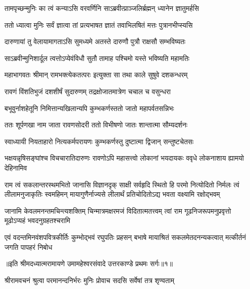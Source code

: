 \twolineshloka
{तामपृच्छन्मुनिः का त्वं कन्याऽसि वरवर्णिनि}
{साऽब्रवीत्प्राञ्जलिर्ब्रह्मन् ध्यानेन ज्ञातुमर्हसि} %

\twolineshloka
{ततो ध्यात्वा मुनिः सर्वं ज्ञात्वा तां प्रत्यभाषत}
{ज्ञातं तवाभिलषितं मत्तः पुत्रानभीप्स्यसि} %

\twolineshloka
{दारुणायां तु वेलायामागताऽसि सुमध्यमे}
{अतस्ते दारुणौ पुत्रौ राक्षसौ सम्भविष्यतः} %

\twolineshloka
{साऽब्रवीन्मुनिशार्दूल त्वत्तोऽप्येवंविधौ सुतौ}
{तामाह पश्चिमो यस्ते भविष्यति महामतिः} %

\twolineshloka
{महाभागवतः श्रीमान् रामभक्त्येकतत्परः}
{इत्युक्ता सा तथा काले सुषुवे दशकन्धरम्} %

\twolineshloka
{रावणं विंशतिभुजं दशशीर्षं सुदारुणम्}
{तद्रक्षोजातमात्रेण चचाल च वसुन्धरा} %

\twolineshloka
{बभूवुर्नाशहेतूनि निमित्तान्यखिलान्यपि}
{कुम्भकर्णस्ततो जातो महापर्वतसन्निभः} %

\twolineshloka
{ततः शूर्पणखा नाम जाता रावणसोदरी}
{ततो विभीषणो जातः शान्तात्मा सौम्यदर्शनः} %

\twolineshloka
{स्वाध्यायी नियताहारो नित्यकर्मपरायणः}
{कुम्भकर्णस्तु दुष्टात्मा द्विजान् सन्तुष्टचेतसः} %

\threelineshloka
{भक्षयन्नृषिसङ्घांश्च विचचारातिदारुणः}
{रावणोऽपि महासत्त्वो लोकानां भयदायकः}
{ववृधे लोकनाशाय ह्यामयो देहिनामिव} %

\fourlineindentedshloka
{राम त्वं सकलान्तरस्थमभितो जानासि विज्ञानदृक्}
{साक्षी सर्वहृदि स्थितो हि परमो नित्योदितो निर्मलः}
{त्वं लीलामनुजाकृतिः स्वमहिमन् मायागुणैर्नाज्यसे}
{लीलार्थं प्रतिचोदितोऽद्य भवता वक्ष्यामि रक्षोद्भवम्} %

\fourlineindentedshloka
{जानामि केवलमनन्तमचिन्त्यशक्तिम्}
{चिन्मात्रमक्षरमजं विदितात्मतत्त्वम्}
{त्वां राम गूढनिजरूपमनुप्रवृत्तो}
{मूढोऽप्यहं भवदनुग्रहतश्चरामि} %

\fourlineindentedshloka
{एवं वदन्तमिनवंशपवित्रकीर्तिः}
{कुम्भोद्भवं रघुपतिः प्रहसन् बभाषे}
{मायाश्रितं सकलमेतदनन्यकत्वात्}
{मत्कीर्तनं जगति पापहरं निबोध} %

{॥इति श्रीमदध्यात्मरामायणे उमामहेश्वरसंवादे उत्तरकाण्डे
प्रथमः सर्गः॥१॥
}





\twolineshloka
{श्रीरामवचनं श्रुत्वा परमानन्दनिर्भरः}
{मुनिः प्रोवाच सदसि सर्वेषां तत्र शृण्वताम्} %

